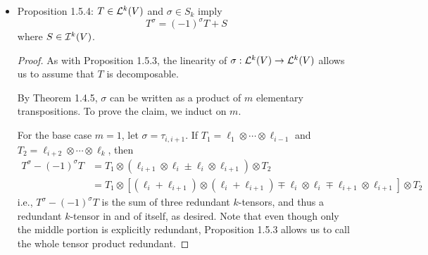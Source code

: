 \documentclass[../notes.tex]{subfiles}
\begin{document}
\begin{itemize}
\begin{proof}
\begin{equation*}
            = \sum a_I(T\otimes e_I^*)
        \end{equation*}
        and similarly for $T'\otimes T$. Thus, if we can prove that each $T\otimes e_I^*\in\ide[r+s]{V}$, it will follow since $\ide[k]{V}$ is a vector space that $\sum a_I(T\otimes e_I^*)=T\otimes T'\in\ide[r+s]{V}$. In other words, we need only prove that $T\otimes T'\in\ide[r+s]{V}$ for $T'$ decomposable, as desired.\par
        Let $T=\ell_1\otimes\cdots\otimes\ell_r$ with $\ell_i=\ell_{i+1}$, and let $T'=\ell_1'\otimes\cdots\otimes\ell_s'$. It follows that
        \begin{equation*}
            T\otimes T' = (\ell_1\otimes\cdots\otimes\ell_i\otimes\ell_{i+1}\otimes\cdots\otimes\ell_r)\otimes(\ell_1'\otimes\cdots\otimes\ell_s')
        \end{equation*}
        is redundant and hence in $\ide[r+s]{V}$, as desired. The argument is symmetric for $T'\otimes T$.
    \end{proof}
    \item Proposition 1.5.4: $T\in\lin[k]{V}$ and $\sigma\in S_k$ imply
    \begin{equation*}
        T^\sigma = (-1)^\sigma T+S
    \end{equation*}
    where $S\in\ide[k]{V}$.
    \begin{proof}
        As with Proposition 1.5.3, the linearity of $\sigma:\lin[k]{V}\to\lin[k]{V}$ allows us to assume that $T$ is decomposable.\par
        By Theorem 1.4.5, $\sigma$ can be written as a product of $m$ elementary transpositions. To prove the claim, we induct on $m$.\par
        For the base case $m=1$, let $\sigma=\tau_{i,i+1}$. If $T_1=\ell_1\otimes\cdots\otimes\ell_{i-1}$ and $T_2=\ell_{i+2}\otimes\cdots\otimes\ell_k$, then
        \begin{align*}
            T^\sigma-(-1)^\sigma T &= T_1\otimes(\ell_{i+1}\otimes\ell_i\pm\ell_i\otimes\ell_{i+1})\otimes T_2\\
            &= T_1\otimes[(\ell_i+\ell_{i+1})\otimes(\ell_i+\ell_{i+1})\mp\ell_i\otimes\ell_i\mp\ell_{i+1}\otimes\ell_{i+1}]\otimes T_2
        \end{align*}
        i.e., $T^\sigma-(-1)^\sigma T$ is the sum of three redundant $k$-tensors, and thus a redundant $k$-tensor in and of itself, as desired. Note that even though only the middle portion is explicitly redundant, Proposition 1.5.3 allows us to call the whole tensor product redundant.\par

\end{proof}
\end{itemize}
\end{document}
